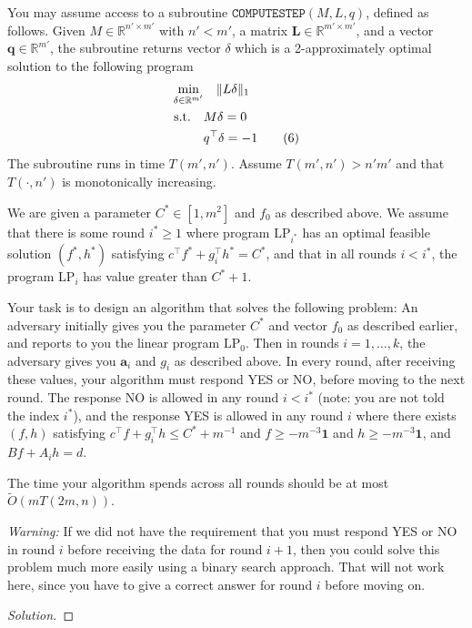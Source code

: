 \documentclass[a4paper,11pt]{article}
\newenvironment{solution}
  {\begin{proof}[Solution]}
  {\end{proof}}
\begin{document}
You may assume access to a subroutine \(\texttt{COMPUTESTEP}(M,L,q)\), defined as follows. Given \(M\in \mathbb{R}^{n'\times m'}\) with \(n'< m'\), a matrix \(\pmb{L}\in \mathbb{R}^{m'\times m'}\), and a vector \(\pmb{q}\in \mathbb{R}^{m'}\), the subroutine returns vector \(\delta\) which is a 2-approximately optimal solution to the following program
\begin{align}
    \min_{\delta \in \mathbb{R}^{m'}} &\quad \|L\delta\|_{1} \notag\\
    \mathrm{s.t.}\quad & M\delta = 0 \notag\\
    & q^{\top}\delta = -1 \tag{6}
\end{align}
The subroutine runs in time \(T(m',n')\). Assume \(T(m',n') > n'm'\) and that \(T(\cdot,n')\) is monotonically increasing.

We are given a parameter \(C^{*}\in [1,m^{2}]\) and \(f_{0}\) as described above. We assume that there is some round \(i^{*}\geq 1\) where program \(\mathrm{LP}_{i^{*}}\) has an optimal feasible solution \((f^{*},h^{*})\) satisfying \(c^{\top}f^{*} + g_{i}^{\top}h^{*} = C^{*}\), and that in all rounds \(i < i^{*}\), the program \(\mathrm{LP}_i\) has value greater than \(C^{*} + 1\).

Your task is to design an algorithm that solves the following problem: An adversary initially gives you the parameter \(C^{*}\) and vector \(f_0\) as described earlier, and reports to you the linear program \(\mathrm{LP}_0\). Then in rounds \(i = 1,\ldots ,k\), the adversary gives you \(\pmb{a}_i\) and \(g_i\) as described above. In every round, after receiving these values, your algorithm must respond YES or NO, before moving to the next round. The response NO is allowed in any round \(i < i^{*}\) (note: you are not told the index \(i^{*}\)), and the response YES is allowed in any round \(i\) where there exists \((f,h)\) satisfying \(c^{\top}f + g_i^{\top}h \leq C^{*} + m^{-1}\) and \(f\geq -m^{-3}\mathbf{1}\) and \(h\geq -m^{-3}\mathbf{1}\), and \(Bf + A_i h = d\).

The time your algorithm spends across all rounds should be at most \(\widetilde{O}(mT(2m,n))\).

\medskip
\noindent\textit{Warning:} If we did not have the requirement that you must respond YES or NO in round \(i\) before receiving the data for round \(i+1\), then you could solve this problem much more easily using a binary search approach. That will not work here, since you have to give a correct answer for round \(i\) before moving on.

\begin{solution}
\end{solution}
\end{document}
